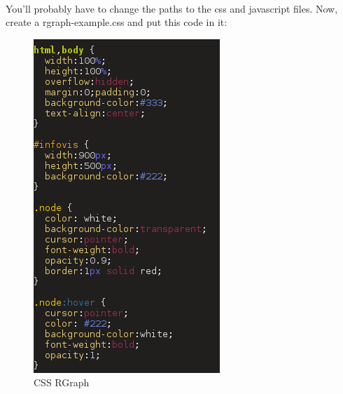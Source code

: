 \paragraph*{}
You'll probably have to change the paths to the css and javascript files. Now, create a rgraph-example.css and put this code in it:

\begin{figure}[h]
\centering
\includegraphics[scale=0.5]{csspage.png}
\caption{CSS RGraph}
\end{figure}

